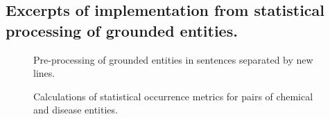 \documentclass[10pt, oneside]{article}
\begin{document}
\clearpage
\begin{appendices}
\section{Excerpts of implementation from statistical processing of grounded entities.} \label{sec:implementations}
\begin{figure}[h]
\caption{\label{fig:preprocessing} Pre-processing of grounded entities in sentences separated by new lines.}
\end{figure}

\begin{figure}[h]
\caption{\label{fig:stats-calc} Calculations of statistical occurrence metrics for pairs of chemical and disease entities.}
\end{figure}

\end{appendices}
\end{document}
